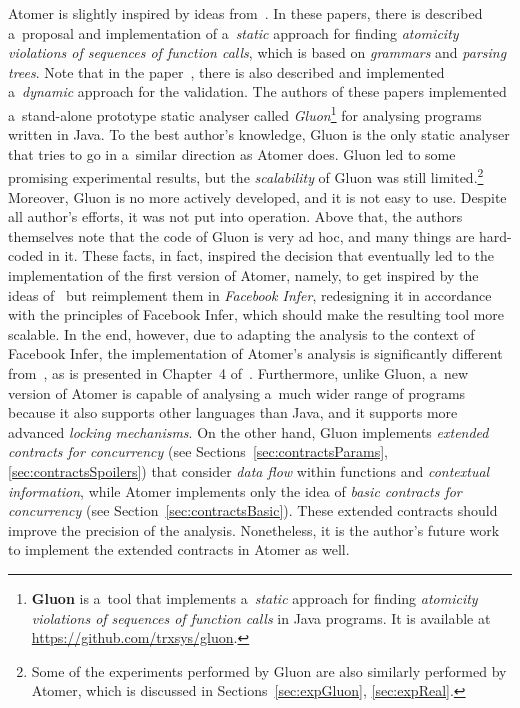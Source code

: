 Atomer is slightly inspired by ideas from~\cite{contracts2017, contracts2015}. In these papers, there is described a~proposal and implementation of a~\emph{static} approach for finding \emph{atomicity violations of sequences of function calls}, which is based on \emph{grammars} and \emph{parsing trees}. Note that in the paper~\cite{contracts2017}, there is also described and implemented a~\emph{dynamic} approach for the validation. The authors of these papers implemented a~stand-alone prototype static analyser called \emph{Gluon}\footnote{\textbf{Gluon} is a~tool that implements a~\emph{static} approach for finding \emph{atomicity violations of sequences of function calls} in Java programs. It is available at \url{https://github.com/trxsys/gluon}.} for analysing programs written in Java. To the best author's knowledge, Gluon is the only static analyser that tries to go in a~similar direction as Atomer does. Gluon led to some promising experimental results, but the \emph{scalability} of Gluon was still limited.\footnote{Some of the experiments performed by Gluon are also similarly performed by Atomer, which is discussed in Sections~\ref{sec:expGluon}, \ref{sec:expReal}.} Moreover, Gluon is no more actively developed, and it is not easy to use. Despite all author's efforts, it was not put into operation. Above that, the authors themselves note that the code of Gluon is very ad hoc, and many things are hard-coded in it. These facts, in fact, inspired the decision that eventually led to the implementation of the first version of Atomer, namely, to get inspired by the ideas of~\cite{contracts2017, contracts2015} but reimplement them in \emph{Facebook Infer}, redesigning it in accordance with the principles of Facebook Infer, which should make the resulting tool more scalable. In the end, however, due to adapting the analysis to the context of Facebook Infer, the implementation of Atomer's analysis is significantly different from~\cite{contracts2017, contracts2015}, as is presented in Chapter~4 of~\cite{harmimBP}. Furthermore, unlike Gluon, a~new version of Atomer is capable of analysing a~much wider range of programs because it also supports other languages than Java, and it supports more advanced \emph{locking mechanisms}. On the other hand, Gluon implements \emph{extended contracts for concurrency} (see Sections~\ref{sec:contractsParams}, \ref{sec:contractsSpoilers}) that consider \emph{data flow} within functions and \emph{contextual information}, while Atomer implements only the idea of \emph{basic contracts for concurrency} (see Section~\ref{sec:contractsBasic}). These extended contracts should improve the precision of the analysis. Nonetheless, it is the author's future work to implement the extended contracts in Atomer as well.

